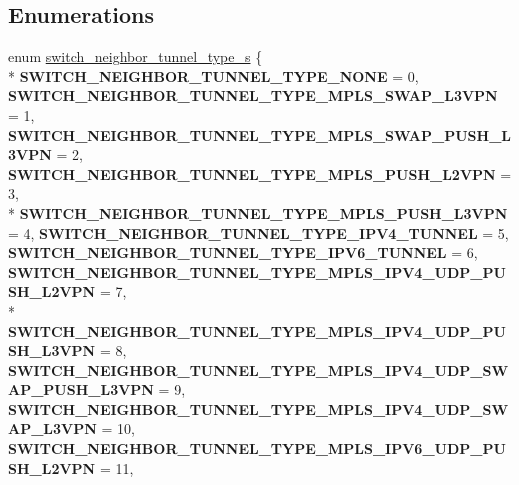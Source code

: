 \subsection*{Enumerations}
\begin{DoxyCompactItemize}
\item 
enum \hyperlink{group__ARP_gae636aa9c208e60064eb6c68c707537f7}{switch\+\_\+neighbor\+\_\+tunnel\+\_\+type\+\_\+s} \{ \\*
{\bfseries S\+W\+I\+T\+C\+H\+\_\+\+N\+E\+I\+G\+H\+B\+O\+R\+\_\+\+T\+U\+N\+N\+E\+L\+\_\+\+T\+Y\+P\+E\+\_\+\+N\+O\+N\+E} = 0, 
{\bfseries S\+W\+I\+T\+C\+H\+\_\+\+N\+E\+I\+G\+H\+B\+O\+R\+\_\+\+T\+U\+N\+N\+E\+L\+\_\+\+T\+Y\+P\+E\+\_\+\+M\+P\+L\+S\+\_\+\+S\+W\+A\+P\+\_\+\+L3\+V\+P\+N} = 1, 
{\bfseries S\+W\+I\+T\+C\+H\+\_\+\+N\+E\+I\+G\+H\+B\+O\+R\+\_\+\+T\+U\+N\+N\+E\+L\+\_\+\+T\+Y\+P\+E\+\_\+\+M\+P\+L\+S\+\_\+\+S\+W\+A\+P\+\_\+\+P\+U\+S\+H\+\_\+\+L3\+V\+P\+N} = 2, 
{\bfseries S\+W\+I\+T\+C\+H\+\_\+\+N\+E\+I\+G\+H\+B\+O\+R\+\_\+\+T\+U\+N\+N\+E\+L\+\_\+\+T\+Y\+P\+E\+\_\+\+M\+P\+L\+S\+\_\+\+P\+U\+S\+H\+\_\+\+L2\+V\+P\+N} = 3, 
\\*
{\bfseries S\+W\+I\+T\+C\+H\+\_\+\+N\+E\+I\+G\+H\+B\+O\+R\+\_\+\+T\+U\+N\+N\+E\+L\+\_\+\+T\+Y\+P\+E\+\_\+\+M\+P\+L\+S\+\_\+\+P\+U\+S\+H\+\_\+\+L3\+V\+P\+N} = 4, 
{\bfseries S\+W\+I\+T\+C\+H\+\_\+\+N\+E\+I\+G\+H\+B\+O\+R\+\_\+\+T\+U\+N\+N\+E\+L\+\_\+\+T\+Y\+P\+E\+\_\+\+I\+P\+V4\+\_\+\+T\+U\+N\+N\+E\+L} = 5, 
{\bfseries S\+W\+I\+T\+C\+H\+\_\+\+N\+E\+I\+G\+H\+B\+O\+R\+\_\+\+T\+U\+N\+N\+E\+L\+\_\+\+T\+Y\+P\+E\+\_\+\+I\+P\+V6\+\_\+\+T\+U\+N\+N\+E\+L} = 6, 
{\bfseries S\+W\+I\+T\+C\+H\+\_\+\+N\+E\+I\+G\+H\+B\+O\+R\+\_\+\+T\+U\+N\+N\+E\+L\+\_\+\+T\+Y\+P\+E\+\_\+\+M\+P\+L\+S\+\_\+\+I\+P\+V4\+\_\+\+U\+D\+P\+\_\+\+P\+U\+S\+H\+\_\+\+L2\+V\+P\+N} = 7, 
\\*
{\bfseries S\+W\+I\+T\+C\+H\+\_\+\+N\+E\+I\+G\+H\+B\+O\+R\+\_\+\+T\+U\+N\+N\+E\+L\+\_\+\+T\+Y\+P\+E\+\_\+\+M\+P\+L\+S\+\_\+\+I\+P\+V4\+\_\+\+U\+D\+P\+\_\+\+P\+U\+S\+H\+\_\+\+L3\+V\+P\+N} = 8, 
{\bfseries S\+W\+I\+T\+C\+H\+\_\+\+N\+E\+I\+G\+H\+B\+O\+R\+\_\+\+T\+U\+N\+N\+E\+L\+\_\+\+T\+Y\+P\+E\+\_\+\+M\+P\+L\+S\+\_\+\+I\+P\+V4\+\_\+\+U\+D\+P\+\_\+\+S\+W\+A\+P\+\_\+\+P\+U\+S\+H\+\_\+\+L3\+V\+P\+N} = 9, 
{\bfseries S\+W\+I\+T\+C\+H\+\_\+\+N\+E\+I\+G\+H\+B\+O\+R\+\_\+\+T\+U\+N\+N\+E\+L\+\_\+\+T\+Y\+P\+E\+\_\+\+M\+P\+L\+S\+\_\+\+I\+P\+V4\+\_\+\+U\+D\+P\+\_\+\+S\+W\+A\+P\+\_\+\+L3\+V\+P\+N} = 10, 
{\bfseries S\+W\+I\+T\+C\+H\+\_\+\+N\+E\+I\+G\+H\+B\+O\+R\+\_\+\+T\+U\+N\+N\+E\+L\+\_\+\+T\+Y\+P\+E\+\_\+\+M\+P\+L\+S\+\_\+\+I\+P\+V6\+\_\+\+U\+D\+P\+\_\+\+P\+U\+S\+H\+\_\+\+L2\+V\+P\+N} = 11, 

\end{DoxyCompactItemize}
